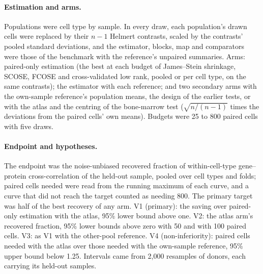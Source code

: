 \begin{table}[h]
\caption{\textbf{Sample, donor and pool allocation of the validation test.} Each row is a fold: the held-out sample's donor and time point (b, baseline; f, follow-up), the two paired samples of its pool (the next two in the fixed order), the other-pool reference (every sample of the other pools whose donor does not appear in the held-out sample's pool; the same for every fold of a pool) and the own-sample reference (the paired samples' non-reservoir cells). Cells of the five cell types analysed. No donor appears on both sides of any fold.}
\label{tab:allocation}
\centering\footnotesize

\end{table}

\paragraph{Estimation and arms.} Populations were cell type by sample. In every draw, each population's drawn cells were replaced by their $n-1$ Helmert contrasts, scaled by the contrasts' pooled standard deviations, and the estimator, blocks, map and comparators were those of the benchmark with the reference's unpaired summaries. Arms: paired-only estimation (the best at each budget of James--Stein shrinkage, SCOSE, FCOSE and cross-validated low rank, pooled or per cell type, on the same contrasts); the estimator with each reference; and two secondary arms with the own-sample reference's population means, the design of the earlier tests, or with the atlas and the centring of the bone-marrow test ($\sqrt{n/(n-1)}$ times the deviations from the paired cells' own means). Budgets were 25 to 800 paired cells with five draws.

\paragraph{Endpoint and hypotheses.} The endpoint was the noise-unbiased recovered fraction of within-cell-type gene--protein cross-correlation of the held-out sample, pooled over cell types and folds; paired cells needed were read from the running maximum of each curve, and a curve that did not reach the target counted as needing 800. The primary target was half of the best recovery of any arm. V1 (primary): the saving over paired-only estimation with the atlas, 95\% lower bound above one. V2: the atlas arm's recovered fraction, 95\% lower bounds above zero with 50 and with 100 paired cells. V3: as V1 with the other-pool reference. V4 (non-inferiority): paired cells needed with the atlas over those needed with the own-sample reference, 95\% upper bound below 1.25. Intervals came from 2,000 resamples of donors, each carrying its held-out samples.

